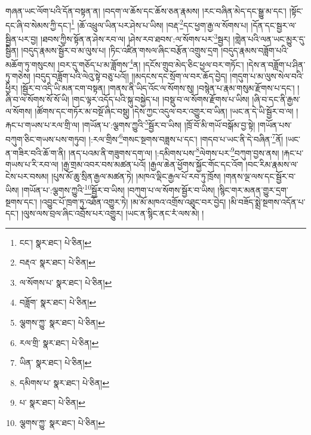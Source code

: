 གཞན་ཡང་ལོག་པའི་དོན་བསྟན་ན། །བདག་ལ་ཆོས་དང་ཆོས་ཅན་རྣམས། །རང་བཞིན་མེད་དང་སྒྱུ་མ་དང་། །སྟོང་དང་ཞི་བ་སེམས་ཀྱི་དང་།\footnote{ངང་།  སྣར་ཐང་།  པེ་ཅིན། } །ཆོ་འཕྲུལ་ཡིན་པར་ཤེས་པ་ཡིས། །བརྡ་\footnote{བརྡའ་  སྣར་ཐང་།  པེ་ཅིན། }དང་ཕྱག་རྒྱ་ལ་སོགས་པ། །དོན་དང་སྦྱར་ལ་སྦྱིན་པར་བྱ། །ཐབས་ཀྱིས་སྟོན་ན་ཤེས་རབ་ལ། །ཤེས་རབ་ཐབས་:ལ་སོགས་པར་\footnote{ལ་སོགས་པ་  སྣར་ཐང་།  པེ་ཅིན། }སྦྱར། །གླེན་པའི་ལན་ཡང་མྱུར་དུ་སྦྱིན། །བདུད་རྣམས་སྦྱོར་བ་མ་ལུས་པ། །ཏིང་འཛིན་གསལ་ཞིང་བརྩོན་འགྲུས་དྲག །བདུད་རྣམས་བཟློག་པའི་མཆོག་ཏུ་གསུངས། །བར་དུ་གཅོད་པ་མ་ཟློགས་\footnote{བཟློག་  སྣར་ཐང་།  པེ་ཅིན། }ན། །དངོས་གྲུབ་མེད་ཅིང་ཕྱལ་བར་གཏོང་། །དེས་ན་བཟློག་པ་ཤིན་ཏུ་གཅེས། །བདུད་བཟློག་པའི་ལེའུ་སྟེ་བཅུ་པའོ།། །།མདངས་དང་སྲོག་ལ་བར་ཆོད་བྱེད། །གདུག་པ་མ་ལུས་སེལ་བའི་ཕྱིར། །སྦྱོར་བ་འདི་ཡི་མན་ངག་བསྟན། །གནས་ནི་ཡིད་འོང་ལ་སོགས་སུ། །བསྙེན་པ་རྣམ་གསུམ་རྫོགས་པ་དང་། །ཞི་བ་ལ་སོགས་སོ་སོ་ཡི། །གང་ལྟར་འདོད་པའི་སྐུ་བསྐྱེད་པ། །བསྡུ་བ་ལ་སོགས་རྫོགས་པ་ཡིས། །ཞི་བ་དང་ནི་རྒྱས་ལ་སོགས། །ཚོགས་དང་གཏོར་མ་བསྔོ་ཞིང་བསྡུ། །དེས་ཀྱང་འདུལ་བར་འགྱུར་བ་ཡིན། །ཡང་ན་དེ་ཡི་སྦྱོར་བ་ལ། །རྐང་པ་གཡས་པ་རལ་གྲི་ལ། །གཡོན་པ་:ལྕགས་ཀྱུའི་\footnote{ལྕགས་ཀྱུ་  སྣར་ཐང་།  པེ་ཅིན། }སྦྱོར་བ་ཡིས། །ཁྲོ་བོ་མི་གཡོ་བསྒོམ་བྱ་སྟེ། །གཡོན་པས་བཀུག་ཅིང་གཡས་པས་གཏུབ། །:རལ་གྲིས་\footnote{རལ་གྲི་  སྣར་ཐང་།  པེ་ཅིན། }གསང་སྔགས་བཟླས་པ་དང་། །གདབ་པ་ཡང་ནི་དེ་བཞིན་\footnote{ཡིན་  སྣར་ཐང་།  པེ་ཅིན། }ནོ། །ཡང་ན་གཟིར་བའི་ཆོ་ག་ནི། །ནད་པའམ་ནི་གཟུགས་དག་ལ། །:དམིགས་པས་\footnote{དམིགས་པ་  སྣར་ཐང་།  པེ་ཅིན། }ལེགས་པར་\footnote{པ་  སྣར་ཐང་།  པེ་ཅིན། }བཀུག་བྱས་ནས། །རྐང་པ་གཡས་པ་རི་རབ་ལ། །རྒྱ་གྲམ་འབར་བས་མཚན་པའོ། །རྒྱལ་ཆེན་ཕྱོགས་སྐྱོང་གོང་དང་འོག །བང་རིམ་རྣམས་ལ་ངེས་པར་བསམ། །པུས་མོ་ཆུ་སྲིན་རྒྱལ་མཚན་ཏེ། །མཁའ་ལྡིང་རྒྱལ་པོ་རབ་ཏུ་ཁྲོས། །གནས་ལྔ་ལས་དང་སྦྱོར་བ་ཡིས། །གཡོན་པ་:ལྕགས་ཀྱུའི་\footnote{ལྕགས་ཀྱུ་  སྣར་ཐང་།  པེ་ཅིན། }སྦྱོར་བ་ཡིས། །བཀུག་པ་ལ་སོགས་སྦྱོར་བ་ཡིས། །སྙིང་གར་མནན་གྱུར་དྲག་སྔགས་དང་། །འབྱུང་པོ་ཁྲག་ཏུ་འཐོན་འགྱུར་ཏེ། །མ་མོ་མཁའ་འགྲོས་འཐུང་བར་བྱེད། །མི་བཟོད་སྨྲེ་སྔགས་འདོན་པ་དང་། །ལུས་ལས་བྲལ་ཞིང་འབྲོས་པར་འགྱུར། །ཡང་ན་སྙིང་ནང་རཾ་ལས་མེ། །
